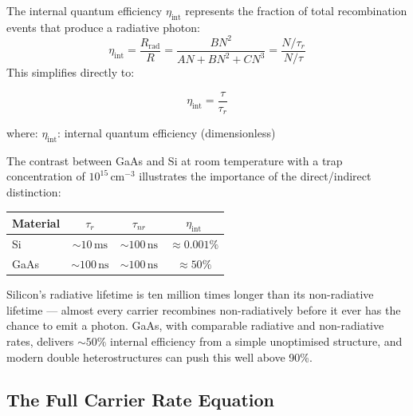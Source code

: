 The internal quantum efficiency $\eta_{\text{int}}$ represents the fraction of total recombination events that produce a radiative photon:
\begin{equation*}
    \eta_{\text{int}} = \frac{R_{\text{rad}}}{R} = \frac{BN^2}{AN + BN^2 + CN^3} = \frac{N/\tau_r}{N/\tau}
\end{equation*}
This simplifies directly to:
\begin{keyresult}
    \begin{equation}
        \eta_\text{int} = \frac{\tau}{\tau_r}
    \end{equation}
\end{keyresult}
where:
$\eta_{\text{int}}$: internal quantum efficiency (dimensionless)

The contrast between GaAs and Si at room temperature with a trap concentration of $10^{15}\,\text{cm}^{-3}$ illustrates the importance of the direct/indirect distinction:

\begin{center}
    \begin{tabular}{@{} l c c c @{}}
        \toprule
        \textbf{Material} & $\tau_r$              & $\tau_{nr}$           & $\eta_\text{int}$ \\
        \midrule
        Si                & $\sim 10\,\text{ms}$  & $\sim 100\,\text{ns}$ & $\approx 0.001\%$ \\
        GaAs              & $\sim 100\,\text{ns}$ & $\sim 100\,\text{ns}$ & $\approx 50\%$    \\
        \bottomrule
    \end{tabular}
\end{center}

Silicon's radiative lifetime is ten million times longer than its non-radiative lifetime — almost every carrier recombines non-radiatively before it ever has the chance to emit a photon. GaAs, with comparable radiative and non-radiative rates, delivers $\sim 50\%$ internal efficiency from a simple unoptimised structure, and modern double heterostructures can push this well above 90\%.

\subsection{The Full Carrier Rate Equation}

